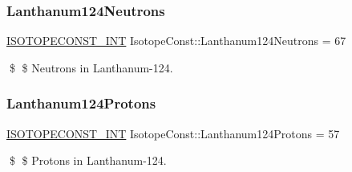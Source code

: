 \subsubsection{\texorpdfstring{Lanthanum124\+Neutrons}{Lanthanum124Neutrons}}
{\footnotesize\ttfamily \mbox{\hyperlink{group___isotope_const-_macros_ga5f18360b3e99483a35c32d789e62621c}{I\+S\+O\+T\+O\+P\+E\+C\+O\+N\+S\+T\+\_\+\+I\+NT}} Isotope\+Const\+::\+Lanthanum124\+Neutrons = 67}

\$ \$ Neutrons in Lanthanum-\/124. \mbox{\label{group___isotope_const-_lanthanum-_la124_gaa5ef6f6bc5d32cdf735ebc513ca43193}} 
\subsubsection{\texorpdfstring{Lanthanum124\+Protons}{Lanthanum124Protons}}
{\footnotesize\ttfamily \mbox{\hyperlink{group___isotope_const-_macros_ga5f18360b3e99483a35c32d789e62621c}{I\+S\+O\+T\+O\+P\+E\+C\+O\+N\+S\+T\+\_\+\+I\+NT}} Isotope\+Const\+::\+Lanthanum124\+Protons = 57}

\$ \$ Protons in Lanthanum-\/124. 
